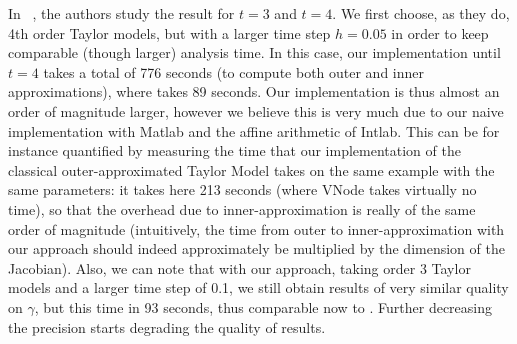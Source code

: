 In ~\cite{Underapproxflowpipes}, the authors study the result for $t=3$ and $t=4$. We first choose, as they do, 4th order Taylor models, 
but with a larger time step $h=0.05$ in order to keep comparable (though larger) analysis time. In this case, our implementation until $t=4$
takes a total of 776 seconds (to compute both outer and inner approximations), where \cite{Underapproxflowpipes} takes 89 seconds.
Our implementation is thus almost an order of magnitude larger, however we believe this is very much due to our naive implementation 
with Matlab and the affine arithmetic of Intlab. This can be for instance quantified by measuring the time  that our implementation of the classical 
outer-approximated Taylor Model takes on the same example with the same parameters: it takes here 213 seconds (where VNode takes virtually no time), 
so that the overhead due to inner-approximation 
is really of the same order of magnitude (intuitively, the time from outer to inner-approximation with our approach should indeed approximately 
be multiplied by the dimension of the Jacobian). 
Also, we can note that with our approach, taking order 3 Taylor models and a larger time step of 0.1, we still obtain results of very similar quality on $\gamma$,
but this time in 93 seconds, thus comparable now to \cite{Underapproxflowpipes}. 
Further decreasing the precision starts degrading the quality of results. 



